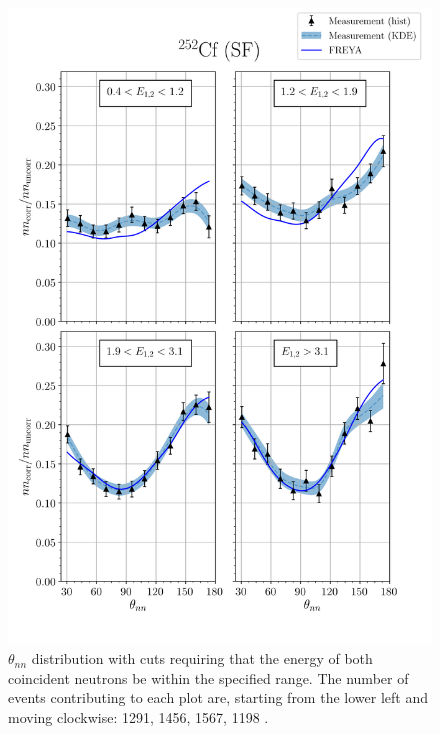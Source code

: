 \begin{figure}
\centering
    \includegraphics[width = \textwidth]{Content/Results/FinalCf252Resultw_freya2KDE.png}
    \caption{$\theta_{nn}$ distribution with cuts requiring that the energy of both coincident neutrons be within the specified range.
    The number of events contributing to each plot are, starting from the lower left and moving clockwise: 1291, 1456, 1567, 1198 .}
    \label{fig:Cf(2)}
\end{figure}

